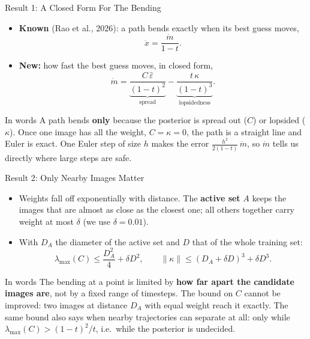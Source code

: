 \documentclass[aspectratio=169]{beamer}
\newcommand{\hl}[1]{\textcolor{coolpurple}{\textbf{#1}}}
\newcommand{\eps}{\hat\varepsilon}
\begin{document}
	\begin{frame}{Result 1: A Closed Form For The Bending}
		\small
		\begin{itemize}
			\item \hl{Known} (Rao et al., 2026): a path bends exactly when its best guess moves,
			$$ \ddot x = \frac{\dot m}{1 - t}. $$
			\item \hl{New:} how fast the best guess moves, in closed form,
			$$ \dot m = \underbrace{\frac{C\,\eps}{(1 - t)^2}}_{\text{spread}} - \underbrace{\frac{t\,\kappa}{(1 - t)^3}}_{\text{lopsidedness}}. $$
		\end{itemize}
		\vspace{-0.4em}
		\begin{block}{In words}
			\footnotesize A path bends \hl{only} because the posterior is spread out ($C$) or lopsided ($\kappa$). Once one image has all the weight, $C = \kappa = 0$, the path is a straight line and Euler is exact. One Euler step of size $h$ makes the error $\frac{h^2}{2(1 - t)}\,\dot m$, so $\dot m$ tells us directly where large steps are safe.
		\end{block}
	\end{frame}

	\begin{frame}{Result 2: Only Nearby Images Matter}
		\small
		\begin{itemize}
			\item Weights fall off exponentially with distance. The \hl{active set} $A$ keeps the images that are almost as close as the closest one; all others together carry weight at most $\delta$ (we use $\delta = 0.01$).
			\item With $D_A$ the diameter of the active set and $D$ that of the whole training set:
			$$ \lambda_{\max}(C) \le \frac{D_A^2}{4} + \delta D^2, \qquad \|\kappa\| \le (D_A + \delta D)^3 + \delta D^3 . $$
		\end{itemize}
		\begin{block}{In words}
			\footnotesize The bending at a point is limited by \hl{how far apart the candidate images are}, not by a fixed range of timesteps. The bound on $C$ cannot be improved: two images at distance $D_A$ with equal weight reach it exactly. The same bound also says when nearby trajectories can separate at all: only while $\lambda_{\max}(C) > (1 - t)^2/t$, i.e.\ while the posterior is undecided.
		\end{block}
	\end{frame}
\end{document}
